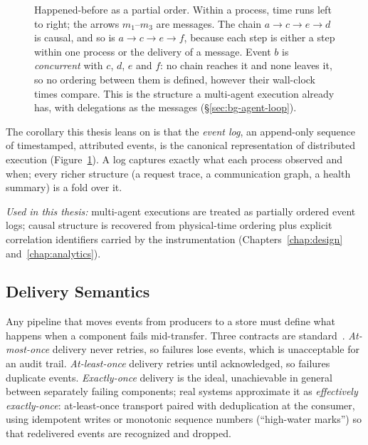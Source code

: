 \begin{figure}[t]
  \centering
  \resizebox{0.78\linewidth}{!}{}
  \caption[Happened-before as a partial order]{Happened-before as a partial
  order. Within a process, time runs left to right; the arrows $m_1$--$m_3$
  are messages. The chain $a \to c \to e \to d$ is causal, and so is
  $a \to c \to e \to f$, because each step is either a step within one
  process or the delivery of a message. Event $b$ is \emph{concurrent} with
  $c$, $d$, $e$ and $f$: no chain reaches it and none leaves it, so no
  ordering between them is defined, however their wall-clock times compare.
  This is the structure a multi-agent execution already has, with
  delegations as the messages (\S\ref{sec:bg-agent-loop}).}
  \label{fig:happenedbefore}
\end{figure}

The corollary this thesis leans on is that the
\emph{event log}, an append-only sequence of timestamped, attributed
events, is the canonical representation of distributed execution
(Figure~\ref{fig:happenedbefore}). A log
captures exactly what each process observed and when; every richer structure
(a request trace, a communication graph, a health summary) is a fold over it.

\emph{Used in this thesis:} multi-agent executions are treated as partially
ordered event logs; causal structure is recovered from physical-time ordering
plus explicit correlation identifiers carried by the instrumentation
(Chapters~\ref{chap:design} and~\ref{chap:analytics}).

\subsection{Delivery Semantics}
\label{sec:bg-delivery}

Any pipeline that moves events from producers to a store must define what
happens when a component fails mid-transfer. Three contracts are
standard~\cite{kleppmann2017ddia}.
\emph{At-most-once} delivery never retries, so failures lose events,
which is unacceptable for an audit trail. \emph{At-least-once} delivery retries until
acknowledged, so failures duplicate events. \emph{Exactly-once} delivery is
the ideal, unachievable in general between separately failing
components; real systems approximate it as \emph{effectively exactly-once}:
at-least-once transport paired with deduplication at the consumer, using
idempotent writes or monotonic sequence numbers (``high-water marks'') so
that redelivered events are recognized and dropped.

